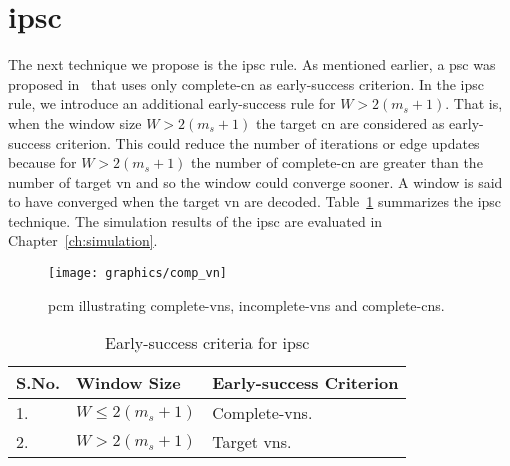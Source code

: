 \section{\acrlong{ipsc}}
The next technique we propose is the \gls{ipsc} rule. As mentioned earlier, a \gls{psc} was proposed in~\cite{Kang2018} that uses only complete-\gls{cn} as early-success criterion. In the \gls{ipsc} rule, we introduce an additional early-success rule for $W>2(m_s+1)$. That is, when the window size $W>2(m_s+1)$ the target \gls{cn} are considered as early-success criterion. This could reduce the number of iterations or edge updates because for $W>2(m_s+1)$ the number of complete-\gls{cn} are greater than the number of target \gls{vn} and so the window could converge sooner. A window is said to have converged when the target \gls{vn} are decoded. Table~\ref{tab:ipsc} summarizes the \gls{ipsc} technique. The simulation results of the \gls{ipsc} are evaluated in Chapter~\ref{ch:simulation}.
\begin{figure}[htbp]
  \centering
  \texttt{[image: graphics/comp\_vn]}
  \caption{\gls{pcm} illustrating complete-\glspl{vn}, incomplete-\glspl{vn} and complete-\glspl{cn}.}
  \label{fig:comp_vn}
\end{figure}

\begin{table}[htbp]
\centering
\begin{tabular}{|l|l|l|}
  \hline
  \textbf{S.No.} &\textbf{Window Size} &\textbf{Early-success Criterion}\\
  \hline
  \hline
  1. &$W\leq2(m_s+1)$ &Complete-\glspl{vn}.\\
  \hline
  2. &$W>2(m_s+1)$ &Target \glspl{vn}.\\
  \hline
\end{tabular}
\caption{Early-success criteria for \gls{ipsc}}
\label{tab:ipsc}
\end{table}